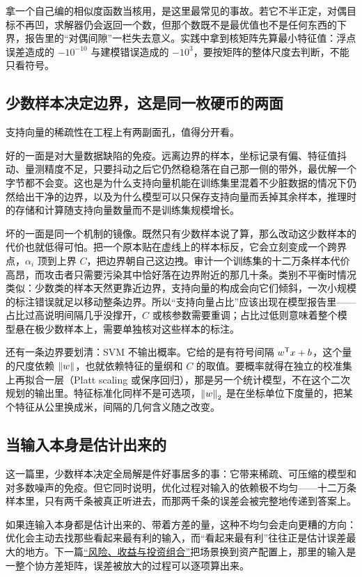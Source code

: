 拿一个自己编的相似度函数当核用，是这里最常见的事故。若它不半正定，对偶目标不再凹，求解器仍会返回一个数，但那个数既不是最优值也不是任何东西的下界，报告里的``对偶间隙''一栏失去意义。实践中拿到核矩阵先算最小特征值：浮点误差造成的 \(-10^{-10}\) 与建模错误造成的 \(-10^{3}\)，要按矩阵的整体尺度去判断，不能只看符号。

\subsection{少数样本决定边界，这是同一枚硬币的两面}

支持向量的稀疏性在工程上有两副面孔，值得分开看。

好的一面是对大量数据缺陷的免疫。远离边界的样本，坐标记录有偏、特征值抖动、量测精度不足，只要抖动之后它仍然稳稳落在自己那一侧的带外，最优解一个字节都不会变。这也是为什么支持向量机能在训练集里混着不少脏数据的情况下仍然给出干净的边界，以及为什么模型可以只保存支持向量而丢掉其余样本，推理时的存储和计算随支持向量数量而不是训练集规模增长。

坏的一面是同一个机制的镜像。既然只有少数样本说了算，那么改动这少数样本的代价也就低得可怕。把一个原本贴在虚线上的样本标反，它会立刻变成一个跨界点，\(\alpha_i\) 顶到上界 \(C\)，把边界朝自己这边拽。审计一个训练集的十二万条样本代价高昂，而攻击者只需要污染其中恰好落在边界附近的那几十条。类别不平衡时情况类似：少数类的样本天然更靠近边界，支持向量的构成会向它们倾斜，一次小规模的标注错误就足以移动整条边界。所以``支持向量占比''应该出现在模型报告里——占比过高说明间隔几乎没撑开，\(C\) 或核参数需要重调；占比过低则意味着整个模型悬在极少数样本上，需要单独核对这些样本的标注。

还有一条边界要划清：SVM 不输出概率。它给的是有符号间隔 \(w^{\mathsf{T}}x+b\)，这个量的尺度依赖 \(\left\lVert w\right\rVert\)，也就依赖特征的量纲和 \(C\) 的取值。要概率就得在独立的校准集上再拟合一层（Platt scaling 或保序回归），那是另一个统计模型，不在这个二次规划的输出里。特征标准化同样不是可选项，\(\left\lVert w\right\rVert_2\) 是在坐标单位下度量的，把某个特征从公里换成米，间隔的几何含义随之改变。

\subsection{当输入本身是估计出来的}

这一篇里，少数样本决定全局解是件好事居多的事：它带来稀疏、可压缩的模型和对多数噪声的免疫。但它同时说明，优化过程对输入的依赖极不均匀——十二万条样本里，只有两千条被真正听进去，而那两千条的误差会被完整地传递到答案上。

如果连输入本身都是估计出来的、带着方差的量，这种不均匀会走向更糟的方向：优化会主动去找那些看起来最有利的输入，而``看起来最有利''往往正是估计误差最大的地方。下一篇\hyperref[sec:09-Convex-Optimization/07-Applications/04]{``风险、收益与投资组合''}把场景换到资产配置上，那里的输入是一整个协方差矩阵，误差被放大的过程可以逐项算出来。
